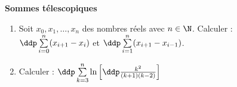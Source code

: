 
\begin{exercice} \; \textbf{Sommes t\'elescopiques}
\begin{enumerate}
\item Soit $x_0,x_1,\dots,x_n$ des nombres r\'eels avec $n\in\N$. Calculer : \; $\ddp \sum\limits_{i=0}^{n} (x_{i+1}-x_i) $ \; et \; $\ddp \sum\limits_{i=1}^{n} (x_{i+1}-x_{i-1})$.
\item Calculer : $\ddp \sum\limits_{k=3}^{n} \ln{\left\lbrack  \ddp\frac{k^2}{(k+1)(k-2)} \right\rbrack}$
\end{enumerate}
\end{exercice}